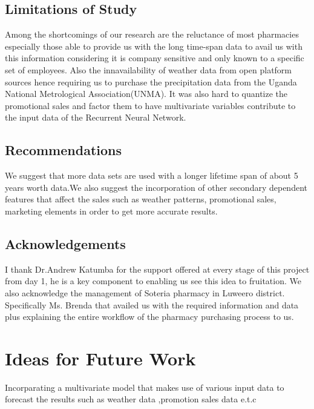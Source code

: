 \documentclass[12pt]{report}
\begin{document}
\subsection{Limitations of Study}
Among the shortcomings of our research are the reluctance of most pharmacies especially those able to provide us with the long time-span data to avail us with this information considering it is company sensitive and only known to a specific set of employees.
Also the innavailability of weather data from open platform sources hence requiring us to purchase the precipitation data from the Uganda National Metrological Association(UNMA).
It was also hard to quantize the promotional sales and factor them to have multivariate variables contribute to the input data of the Recurrent Neural Network.

\subsection{Recommendations}
We suggest that more data sets are used with a longer lifetime span of about 5 years worth data.We also suggest the incorporation of other secondary dependent features that affect the sales such as weather patterns, promotional sales, marketing elements in order to get more accurate results. 

\subsection{Acknowledgements}
I thank Dr.Andrew Katumba for the support offered at every stage of this project from day 1, he is a key component to enabling us see this idea to fruitation. We also acknowledge the management of Soteria pharmacy in Luweero district. Specifically Ms. Brenda that availed us with the required information and data plus explaining the entire workflow of the pharmacy purchasing process to us.\\

\section{Ideas for Future Work}
Incorparating a multivariate model that makes use of various input data to forecast the results such as weather data ,promotion sales data e.t.c


\end{document}
